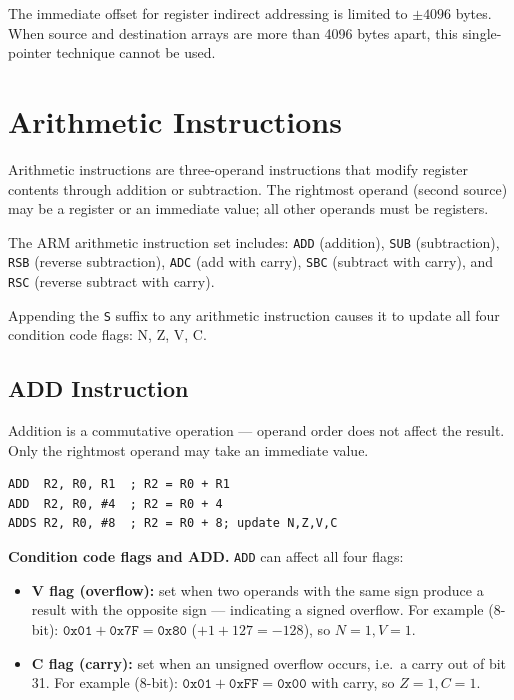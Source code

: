 \documentclass[11pt, a4paper, notitlepage]{report}
\theoremstyle{definition}
\theoremstyle{remark}
\theoremstyle{definition}
\begin{document}
\begin{warning}[title={Offset Range Limit}]
The immediate offset for register indirect addressing is limited to $\pm 4096$ bytes. When source and destination arrays are more than 4096 bytes apart, this single-pointer technique cannot be used.
\end{warning}

\section{Arithmetic Instructions}

Arithmetic instructions are three-operand instructions that modify register contents through addition or subtraction. The rightmost operand (second source) may be a register or an immediate value; all other operands must be registers.

The ARM arithmetic instruction set includes: \texttt{ADD} (addition), \texttt{SUB} (subtraction), \texttt{RSB} (reverse subtraction), \texttt{ADC} (add with carry), \texttt{SBC} (subtract with carry), and \texttt{RSC} (reverse subtract with carry).

Appending the \texttt{S} suffix to any arithmetic instruction causes it to update all four condition code flags: N, Z, V, C\@.

\subsection{ADD Instruction}

Addition is a commutative operation --- operand order does not affect the result. Only the rightmost operand may take an immediate value.

\begin{lstlisting}
ADD  R2, R0, R1  ; R2 = R0 + R1
ADD  R2, R0, #4  ; R2 = R0 + 4
ADDS R2, R0, #8  ; R2 = R0 + 8; update N,Z,V,C
\end{lstlisting}

\textbf{Condition code flags and ADD.} \texttt{ADD} can affect all four flags:

\begin{itemize}
  \item \textbf{V flag (overflow):} set when two operands with the same sign produce a result with the opposite sign --- indicating a signed overflow. For example (8-bit): $\texttt{0x01} + \texttt{0x7F} = \texttt{0x80}$ ($+1 + 127 = -128$), so $N=1, V=1$.
  \item \textbf{C flag (carry):} set when an unsigned overflow occurs, i.e.\ a carry out of bit 31. For example (8-bit): $\texttt{0x01} + \texttt{0xFF} = \texttt{0x00}$ with carry, so $Z=1, C=1$.
\end{itemize}
\end{document}
